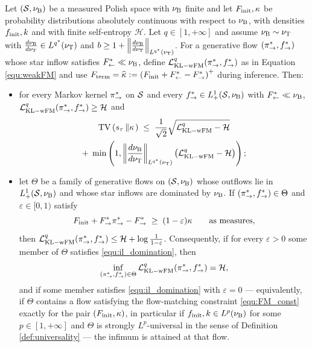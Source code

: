 \begin{theorem} \label{theo:IL_CV_bound} Let $(\mathcal S,\nu_{\mathrm{B}})$ be a measured Polish space with $\nu_{\mathrm{B}}$ finite and let $F_{\mathrm{init}},\kappa$ be probability distributions absolutely continuous with respect to $\nu_{\mathrm{B}}$, with densities $f_{\mathrm{init}},k$ and with finite self-entropy $\mathcal H$. Let $q\in[1,+\infty]$ and assume $\nu_{\mathrm{B}}\sim\nu_{\mathrm{T}}$ with $\frac{d\nu_{\mathrm{B}}}{d\nu_{\mathrm{T}}}\in L^{q^*}(\nu_{\mathrm{T}})$ and $b\geq1+\left\|\frac{d\nu_{\mathrm{B}}}{d\nu_{\mathrm{T}}}\right\|_{L^{q^*}(\nu_{\mathrm{T}})}$. For a generative flow $(\pi_{\rightarrow}^*,f^*_{\rightarrow})$ whose star inflow satisfies $F^*_{\leftarrow}\ll\nu_{\mathrm{B}}$, define $\mathcal L_{\mathrm{KL-wFM}}^q(\pi_{\rightarrow}^*,f^*_{\rightarrow})$ as in Equation \eqref{equ:weakFM} and use $F_{\mathrm{term}}=\widehat{\kappa}:=  \left(F_{\mathrm{init}}+F^*_{\leftarrow}-F^*_{\rightarrow}\right)^+$ during inference. Then:
 \begin{itemize}
     \item for every Markov kernel $\pi_{\rightarrow}^*$ on $\mathcal S$ and every $f^*_{\rightarrow}\in L^1_+(\mathcal S,\nu_{\mathrm{B}})$ with $F^*_{\leftarrow}\ll\nu_{\mathrm{B}}$, $\mathcal L_{\mathrm{KL-wFM}}^q(\pi_{\rightarrow}^*,f^*_{\rightarrow})\geq\mathcal H$ and
\begin{multline}\label{equ:il_tv_explicit}
   \mathrm{TV}\left(s_\tau \left\| \kappa \right.\right) \;\leq\; \frac{1}{\sqrt 2}\sqrt{\mathcal L_{\mathrm{KL-wFM}}^q-\mathcal H} \\ +\;\min\left(1,\left\|\frac{d\nu_{\mathrm{B}}}{d\nu_{\mathrm{T}}}\right\|_{L^{q^*}(\nu_{\mathrm{T}})}\left(\mathcal L_{\mathrm{KL-wFM}}^q-\mathcal H\right)\right) ;
\end{multline}
     \item let $\Theta$ be a family of generative flows on $(\mathcal S,\nu_{\mathrm{B}})$ whose outflows lie in $L^1_+(\mathcal S,\nu_{\mathrm{B}})$ and whose star inflows are dominated by $\nu_{\mathrm{B}}$. If $(\pi_{\rightarrow}^*,f^*_{\rightarrow})\in\Theta$ and $\varepsilon\in[0,1)$ satisfy
\begin{equation}\label{equ:il_domination}
    F_{\mathrm{init}}+F^*_{\rightarrow}\pi_{\rightarrow}^*-F^*_{\rightarrow}\;\geq\;(1-\varepsilon)\kappa\qquad\text{as measures,}
\end{equation}
then $\mathcal L_{\mathrm{KL-wFM}}^q(\pi_{\rightarrow}^*,f^*_{\rightarrow})\leq\mathcal H+\log\frac{1}{1-\varepsilon}$. Consequently, if for every $\varepsilon>0$ some member of $\Theta$ satisfies \eqref{equ:il_domination}, then
\begin{equation}
    \inf_{(\pi_{\rightarrow}^*,f^*_{\rightarrow})\in\Theta}\mathcal L_{\mathrm{KL-wFM}}^q(\pi_{\rightarrow}^*,f^*_{\rightarrow}) = \mathcal H ,
\end{equation}
and if some member satisfies \eqref{equ:il_domination} with $\varepsilon=0$ --- equivalently, if $\Theta$ contains a flow satisfying the flow-matching constraint \eqref{equ:FM_const} exactly for the pair $(F_{\mathrm{init}},\kappa)$, in particular if $f_{\mathrm{init}},k\in L^p(\nu_{\mathrm{B}})$ for some $p\in[1,+\infty]$ and $\Theta$ is strongly $L^p$-universal in the sense of Definition \ref{def:universality} --- the infimum is attained at that flow.
 \end{itemize}
\end{theorem}


